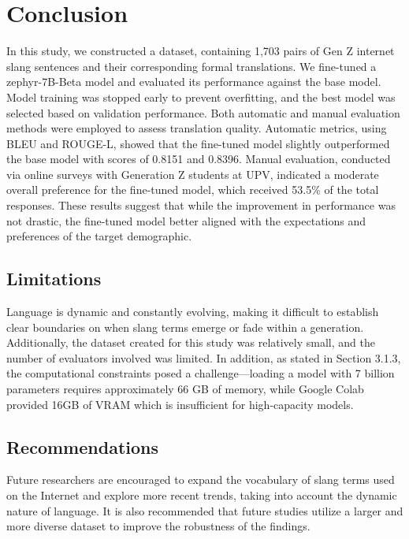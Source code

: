 \chapter{Conclusion}
In this study, we constructed a dataset, containing 1,703 pairs of Gen Z internet slang sentences and their corresponding formal translations. We fine-tuned a zephyr-7B-Beta model and  evaluated its performance against the base model. Model training was stopped early to prevent overfitting, and the best model was selected based on validation performance. Both automatic and manual evaluation methods were employed to assess translation quality. Automatic metrics, using BLEU and ROUGE-L, showed that the fine-tuned model slightly outperformed the base model with scores of 0.8151 and 0.8396. Manual evaluation, conducted via online surveys with Generation Z students at UPV, indicated a moderate overall preference for the fine-tuned model, which received 53.5\% of the total responses. These results suggest that while the improvement in performance was not drastic, the fine-tuned model better aligned with the expectations and preferences of the target demographic.

\section{Limitations}
Language is dynamic and constantly evolving, making it difficult to establish clear boundaries on when slang terms emerge or fade within a generation. Additionally, the dataset created for this study was relatively small, and the number of evaluators involved was limited. In addition, as stated in Section 3.1.3, the computational constraints posed a challenge—loading a model with 7 billion parameters requires approximately 66 GB of memory, while Google Colab provided 16GB of VRAM which is insufficient for high-capacity models.

\section{Recommendations}
Future researchers are encouraged to expand the vocabulary of slang terms used on the Internet and explore more recent trends, taking into account the dynamic nature of language. It is also recommended that future studies utilize a larger and more diverse dataset to improve the robustness of the findings.